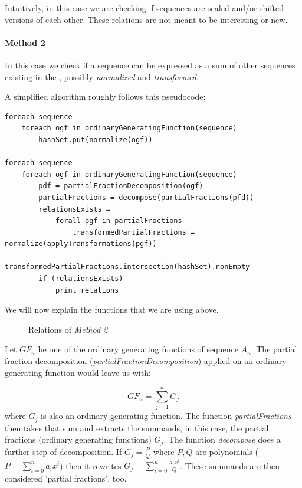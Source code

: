 Intuitively, in this case we are checking if sequences are scaled and/or shifted versions of each other. These
relations are not meant to be interesting or new.

\paragraph{Method 2} In this case we check if a sequence can be expressed as a sum of other sequences existing in the
 \oeis, possibly \emph{normalized} and \emph{transformed}.

A simplified algorithm roughly follows this pseudocode:
\newpage
\begin{lstlisting}[style=myScalastyle]
foreach sequence
    foreach ogf in ordinaryGeneratingFunction(sequence)
        hashSet.put(normalize(ogf))

foreach sequence
    foreach ogf in ordinaryGeneratingFunction(sequence)
        pdf = partialFractionDecomposition(ogf)
        partialFractions = decompose(partialFractions(pfd))
        relationsExists =
            forall pgf in partialFractions
                transformedPartialFractions = normalize(applyTransformations(pgf))
                transformedPartialFractions.intersection(hashSet).nonEmpty
        if (relationsExists)
            print relations
\end{lstlisting}

We will now explain the functions that we are using above.


\begin{figure}
\caption{Relations of \emph{Method 2}}\label{fig:directRelations}
\end{figure}

Let $GF_n$ be one of the ordinary generating functions of sequence $A_n$. The partial fraction decomposition
(\emph{partialFractionDecomposition}) applied on an ordinary generating function would leave us with:

\begin{equation}
 GF_n = \sum_{j=1}^{n} G_j \label{eq:pfd}
\end{equation}
where $G_j$ is also an ordinary generating function. The function \emph{partialFractions} then takes that sum and
extracts the summands, in this case, the partial fractions (ordinary generating functions) $G_j$. The function
\emph{decompose} does a further step of decomposition. If $G_j = \frac{P}{Q}$ where $P,Q$ are polynomials ( $P =
\sum_{i=0}^{n} a_ix^i$) then it rewrites $G_j = \sum_{i=0}^{n} \frac{a_ix^i}{Q}$. These summands are then considered
'partial fractions', too.

